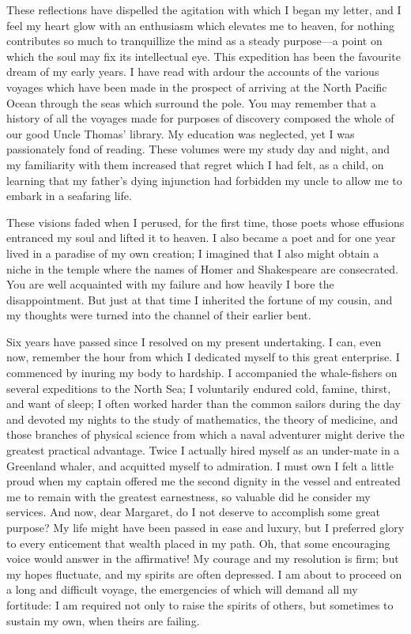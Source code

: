 These reflections have dispelled the agitation with which I began my letter, and I feel my heart glow with an enthusiasm which elevates me to heaven, for nothing contributes so much to tranquillize the mind as a steady purpose---a point on which the soul may fix its intellectual eye. This expedition has been the favourite dream of my early years. I have read with ardour the accounts of the various voyages which have been made in the prospect of arriving at the North Pacific Ocean through the seas which surround the pole. You may remember that a history of all the voyages made for purposes of discovery composed the whole of our good Uncle Thomas' library. My education was neglected, yet I was passionately fond of reading. These volumes were my study day and night, and my familiarity with them increased that regret which I had felt, as a child, on learning that my father's dying injunction had forbidden my uncle to allow me to embark in a seafaring life.

These visions faded when I perused, for the first time, those poets whose effusions entranced my soul and lifted it to heaven. I also became a poet and for one year lived in a paradise of my own creation; I imagined that I also might obtain a niche in the temple where the names of Homer and Shakespeare are consecrated. You are well acquainted with my failure and how heavily I bore the disappointment. But just at that time I inherited the fortune of my cousin, and my thoughts were turned into the channel of their earlier bent.

Six years have passed since I resolved on my present undertaking. I can, even now, remember the hour from which I dedicated myself to this great enterprise. I commenced by inuring my body to hardship. I accompanied the whale-fishers on several expeditions to the North Sea; I voluntarily endured cold, famine, thirst, and want of sleep; I often worked harder than the common sailors during the day and devoted my nights to the study of mathematics, the theory of medicine, and those branches of physical science from which a naval adventurer might derive the greatest practical advantage. Twice I actually hired myself as an under-mate in a Greenland whaler, and acquitted myself to admiration. I must own I felt a little proud when my captain offered me the second dignity in the vessel and entreated me to remain with the greatest earnestness, so valuable did he consider my services. And now, dear Margaret, do I not deserve to accomplish some great purpose? My life might have been passed in ease and luxury, but I preferred glory to every enticement that wealth placed in my path. Oh, that some encouraging voice would answer in the affirmative! My courage and my resolution is firm; but my hopes fluctuate, and my spirits are often depressed. I am about to proceed on a long and difficult voyage, the emergencies of which will demand all my fortitude: I am required not only to raise the spirits of others, but sometimes to sustain my own, when theirs are failing.

